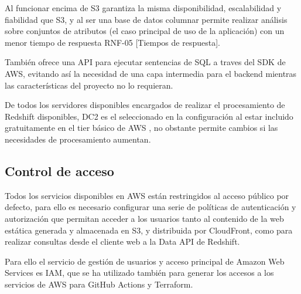 Al funcionar encima de S3 garantiza la misma disponibilidad, escalabilidad y fiabilidad que S3, y al ser una base de datos columnar permite realizar análisis sobre conjuntos de atributos (el caso principal de uso de la aplicación) con un menor tiempo de respuesta RNF-05 [Tiempos de respuesta].

También ofrece una API para ejecutar sentencias de SQL a traves del SDK de AWS, evitando así la necesidad de una capa intermedia para el backend mientras las características del proyecto no lo requieran.

De todos los servidores disponibles encargados de realizar el procesamiento de Redshift disponibles, DC2 es el seleccionado en la configuración al estar incluido gratuitamente en el tier básico de AWS \cite{RedshiftPricing}, no obstante permite cambios si las necesidades de procesamiento aumentan.

\subsection{Control de acceso}

Todos los servicios disponibles en AWS están restringidos al acceso público por defecto, para ello es necesario configurar una serie de políticas de autenticación y autorización que permitan acceder a los usuarios tanto al contenido de la web estática generada y almacenada en S3, y distribuida por CloudFront, como para realizar consultas desde el cliente web a la Data API de Redshift.

Para ello el servicio de gestión de usuarios y acceso principal de Amazon Web Services es IAM, que se ha utilizado también para generar los accesos a los servicios de AWS para GitHub Actions y Terraform.
